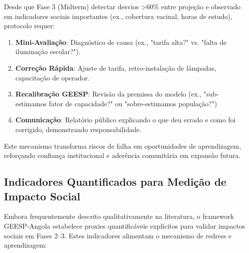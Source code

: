 \documentclass[12pt, a4paper]{article}
\begin{document}
Desde que Fase 3 (Midterm) detectar desvios >60\% entre projeção e observado em indicadores sociais importantes (ex., cobertura vacinal, horas de estudo), protocolo requer:

\begin{enumerate}
\item \textbf{Mini-Avaliação}: Diagnóstico de causa (ex., "tarifa alta?" vs. "falta de iluminação escolar?").
\item \textbf{Correção Rápida}: Ajuste de tarifa, retro-instalação de lâmpadas, capacitação de operador.
\item \textbf{Recalibração GEESP}: Revisão da premissa do modelo (ex., "sub-estimamos fator de capacidade?" ou "sobre-estimamos população?")
\item \textbf{Comunicação}: Relatório público explicando o que deu errado e como foi corrigido, demonstrando responsabilidade.
\end{enumerate}

Este mecanismo transforma riscos de falha em oportunidades de aprendizagem, reforçando confiança institucional e aderência comunitária em expansão futura.

\subsection{Indicadores Quantificados para Medição de Impacto Social}

Embora frequentemente descrito qualitativamente na literatura, o framework GEESP-Angola estabelece proxies quantificáveis explícitos para validar impactos sociais em Fases 2--3. Estes indicadores alimentam o mecanismo de redress e aprendizagem:
\end{document}
